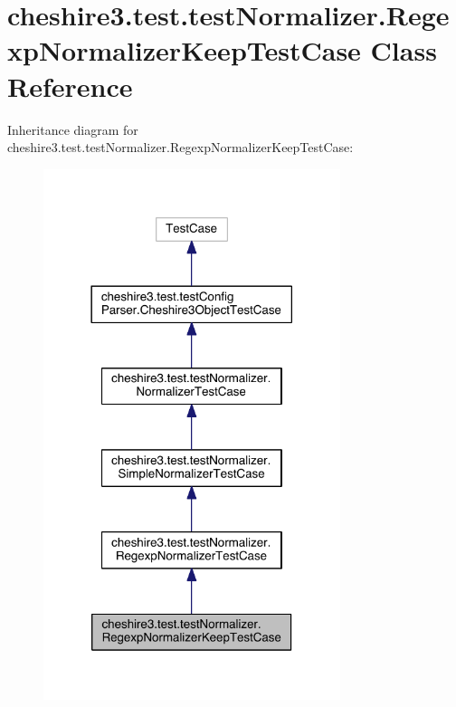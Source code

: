 \hypertarget{classcheshire3_1_1test_1_1test_normalizer_1_1_regexp_normalizer_keep_test_case}{\section{cheshire3.\-test.\-test\-Normalizer.\-Regexp\-Normalizer\-Keep\-Test\-Case Class Reference}
\label{classcheshire3_1_1test_1_1test_normalizer_1_1_regexp_normalizer_keep_test_case}
}


Inheritance diagram for cheshire3.\-test.\-test\-Normalizer.\-Regexp\-Normalizer\-Keep\-Test\-Case\-:
\nopagebreak
\begin{figure}[H]
\begin{center}
\leavevmode
\includegraphics[width=246pt]{classcheshire3_1_1test_1_1test_normalizer_1_1_regexp_normalizer_keep_test_case__inherit__graph}
\end{center}
\end{figure}


